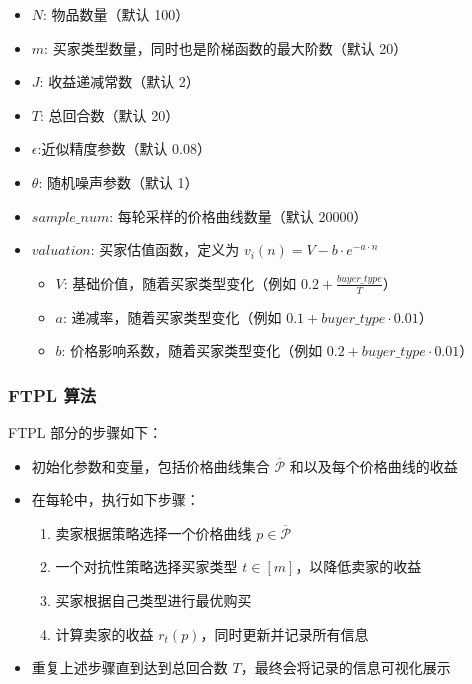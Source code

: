 \begin{itemize}
    \item $N$: 物品数量（默认 100）
    \item $m$: 买家类型数量，同时也是阶梯函数的最大阶数（默认 20）
    \item $J$: 收益递减常数（默认 2）
    \item $T$: 总回合数（默认 20）
    \item $\epsilon$:近似精度参数（默认 0.08）
    \item $\theta$: 随机噪声参数（默认 1）
    \item $sample\_num$: 每轮采样的价格曲线数量（默认 20000）
    \item $valuation$: 买家估值函数，定义为 $v_i(n) = V - b \cdot e^{-a \cdot n}$
    \begin{itemize}
        \item $V$: 基础价值，随着买家类型变化（例如 $0.2 + \frac{buyer\_type}{T}$）
        \item $a$: 递减率，随着买家类型变化（例如 $0.1 + buyer\_type \cdot 0.01$）
        \item $b$: 价格影响系数，随着买家类型变化（例如 $0.2 + buyer\_type \cdot 0.01$）
    \end{itemize}
\end{itemize}

\subsubsection{FTPL 算法}

FTPL 部分的步骤如下：

\begin{itemize}
    \item 初始化参数和变量，包括价格曲线集合 $\overline{\mathcal{P}}$ 和以及每个价格曲线的收益
    \item 在每轮中，执行如下步骤：
    \begin{enumerate}
        \item 卖家根据策略选择一个价格曲线 $p \in \overline{\mathcal{P}}$
        \item 一个对抗性策略选择买家类型 $t \in [m]$，以降低卖家的收益
        \item 买家根据自己类型进行最优购买
        \item 计算卖家的收益 $r_t(p)$，同时更新并记录所有信息
    \end{enumerate}
    \item 重复上述步骤直到达到总回合数 $T$，最终会将记录的信息可视化展示
\end{itemize}

